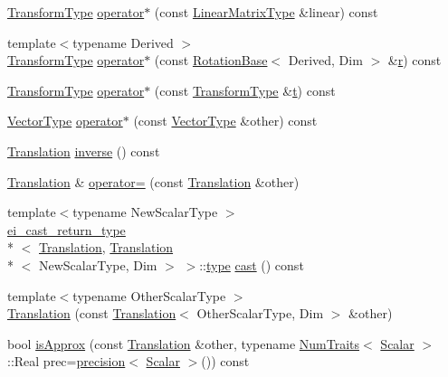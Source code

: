 \begin{DoxyCompactItemize}
\item 
\hyperlink{class_translation_a17aa136dd5b74ba443a87887a77e6e3b}{Transform\-Type} \hyperlink{class_translation_aa0b93d8e36712cac0867897d0e3e9dab}{operator$\ast$} (const \hyperlink{class_translation_a4e4dc4e17b8a4d243682fa2d9bbeaa38}{Linear\-Matrix\-Type} \&linear) const 
\item 
{\footnotesize template$<$typename Derived $>$ }\\\hyperlink{class_translation_a17aa136dd5b74ba443a87887a77e6e3b}{Transform\-Type} \hyperlink{class_translation_ab2144a482259ab8440cb6f4f80dfacff}{operator$\ast$} (const \hyperlink{class_rotation_base}{Rotation\-Base}$<$ Derived, Dim $>$ \&\hyperlink{glext_8h_abe08814c2f72843fde4d8df41440d5a0}{r}) const 
\item 
\hyperlink{class_translation_a17aa136dd5b74ba443a87887a77e6e3b}{Transform\-Type} \hyperlink{class_translation_a9dcf86f1c66b580f11ed3bc1fe6b15b7}{operator$\ast$} (const \hyperlink{class_translation_a17aa136dd5b74ba443a87887a77e6e3b}{Transform\-Type} \&\hyperlink{glext_8h_a00140d6f5c548b26daf170bf16e86a6d}{t}) const 
\item 
\hyperlink{class_translation_a1b1ee9d6d92ffebecdb94e4827653ef2}{Vector\-Type} \hyperlink{class_translation_a610ded6a8df3943d8ba67db5c2038f44}{operator$\ast$} (const \hyperlink{class_translation_a1b1ee9d6d92ffebecdb94e4827653ef2}{Vector\-Type} \&other) const 
\item 
\hyperlink{class_translation}{Translation} \hyperlink{class_translation_a9e150137d4f26c47c98f494fa085df7a}{inverse} () const 
\item 
\hyperlink{class_translation}{Translation} \& \hyperlink{class_translation_a65dd32d9c313401537e61bcde1eda51d}{operator=} (const \hyperlink{class_translation}{Translation} \&other)
\item 
{\footnotesize template$<$typename New\-Scalar\-Type $>$ }\\\hyperlink{structei__cast__return__type}{ei\-\_\-cast\-\_\-return\-\_\-type}\\*
$<$ \hyperlink{class_translation}{Translation}, \hyperlink{class_translation}{Translation}\\*
$<$ New\-Scalar\-Type, Dim $>$ $>$\-::\hyperlink{glext_8h_a7d05960f4f1c1b11f3177dc963a45d86}{type} \hyperlink{class_translation_adb7cacb396412bd4e39ea8d76756f3cf}{cast} () const 
\item 
{\footnotesize template$<$typename Other\-Scalar\-Type $>$ }\\\hyperlink{class_translation_a410930c8d98a9acafb7818df17187f2c}{Translation} (const \hyperlink{class_translation}{Translation}$<$ Other\-Scalar\-Type, Dim $>$ \&other)
\item 
bool \hyperlink{class_translation_a346d00500a889e3b6f26187b0e0ef2db}{is\-Approx} (const \hyperlink{class_translation}{Translation} \&other, typename \hyperlink{struct_num_traits}{Num\-Traits}$<$ \hyperlink{class_translation_a3ac09e6bdde38180bd4144846e760226}{Scalar} $>$\-::Real prec=\hyperlink{_math_functions_8h_a3dc1c65cf9dc9b5a7ee66472d0ae83e1}{precision}$<$ \hyperlink{class_translation_a3ac09e6bdde38180bd4144846e760226}{Scalar} $>$()) const 
\end{DoxyCompactItemize}
